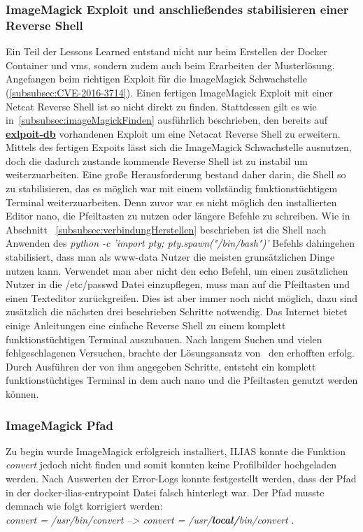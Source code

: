 \documentclass[10pt, a4paper,onecolumn ,titlepage]{article}
\begin{document}
    \subsubsection{ImageMagick Exploit und anschließendes stabilisieren einer Reverse Shell}
    \label{subsubsec:lessonslearnedShell}
    Ein Teil der Lessons Learned entstand nicht nur beim Erstellen der Docker Container und \ac{vm}s, sondern zudem auch beim Erarbeiten der Musterlösung.
    Angefangen beim richtigen Exploit für die ImageMagick Schwachstelle (\ref{subsubsec:CVE-2016-3714}).
    Einen fertigen ImageMagick Exploit mit einer Netcat Reverse Shell ist so nicht direkt zu finden.
    Stattdessen gilt es wie in~\ref{subsubsec:imageMagickFinden} ausführlich beschrieben, den bereits auf \href{https://www.exploit-db.com/exploits/39767}{\textbf{exlpoit-db}} vorhandenen Exploit um eine Netacat Reverse Shell zu erweitern.
    Mittels des fertigen Expoits lässt sich die ImageMagick Schwachstelle ausnutzen, doch die dadurch zustande kommende Reverse Shell ist zu instabil um weiterzuarbeiten.
    Eine große Herausforderung bestand daher darin, die Shell so zu stabilisieren, das es möglich war mit einem vollständig funktionstüchtigem Terminal weiterzuarbeiten.
    Denn zuvor war es nicht möglich den installierten Editor nano, die Pfeiltasten zu nutzen oder längere Befehle zu schreiben.
    Wie in Abschnitt ~\ref{subsubsec:verbindungHerstellen} beschrieben ist die Shell nach Anwenden des \textit{python -c 'import pty; pty.spawn("/bin/bash")'} Befehls dahingehen stabilisiert, dass man als www-data Nutzer die meisten grunsätzlichen Dinge nutzen kann.
    Verwendet man aber nicht den echo Befehl, um einen zusätzlichen Nutzer in die /etc/passwd Datei einzupflegen, muss man auf die Pfeiltasten und einen Texteditor zurückgreifen.
    Dies ist aber immer noch nicht möglich, dazu sind zusätzlich die nächsten drei beschrieben Schritte notwendig.
    Das Internet bietet einige Anleitungen eine einfache Reverse Shell zu einem komplett funktionstüchtigen Terminal auszubauen.
    Nach langem Suchen und vielen fehlgeschlagenen Versuchen, brachte der Lösungsansatz von~\textcite{shellStabilisieren} den erhofften erfolg.
    Durch Ausführen der von ihm angegeben Schritte, entsteht ein komplett funktionstüchtiges Terminal in dem auch nano und die Pfeiltasten genutzt werden können.


    \subsubsection{ImageMagick Pfad}
    \label{subsubsec:lessonslearnedPath}
    Zu begin wurde ImageMagick erfolgreich installiert, ILIAS konnte die Funktion \textit{convert} jedoch nicht finden und somit konnten keine Profilbilder hochgeladen werden.
    Nach Auswerten der Error-Logs konnte festgestellt werden, dass der Pfad in der docker-ilias-entrypoint Datei falsch hinterlegt war.
    Der Pfad musste demnach wie folgt korrigiert werden:
    \\
    \textit{
        convert = /usr/bin/convert
        -->
        convert = /usr/\textbf{local/}bin/convert
    }.
\end{document}
